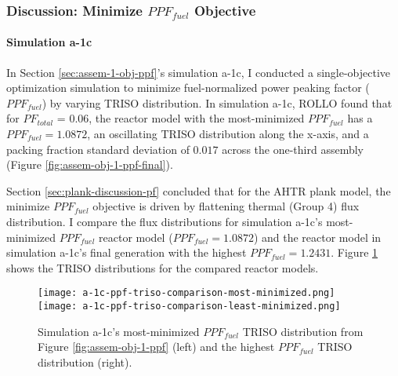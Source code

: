 \subsubsection{Discussion: Minimize $PPF_{fuel}$ Objective}
\paragraph{Simulation a-1c}
In Section \ref{sec:assem-1-obj-ppf}'s simulation a-1c, I conducted a single-objective 
optimization simulation to minimize fuel-normalized power peaking factor ($PPF_{fuel}$) 
by varying TRISO distribution. 
In simulation a-1c, \gls{ROLLO} found that for $PF_{total}$ = 0.06, the reactor model 
with the most-minimized $PPF_{fuel}$ has a $PPF_{fuel} = 1.0872$, an oscillating 
TRISO distribution along the x-axis, and a packing fraction standard deviation of 
$0.017$ across the one-third assembly (Figure \ref{fig:assem-obj-1-ppf-final}). 

Section \ref{sec:plank-discussion-pf} concluded that for the \gls{AHTR} plank 
model, the minimize $PPF_{fuel}$ objective is driven by flattening thermal 
(Group 4) flux distribution. 
I compare the flux distributions for simulation a-1c's most-minimized $PPF_{fuel}$ 
reactor model ($PPF_{fuel} = 1.0872$) and the reactor model in simulation a-1c's 
final generation with the highest $PPF_{fuel} = 1.2431$. 
Figure \ref{fig:a-1c-ppf-triso-comparison} shows the TRISO distributions for the 
compared reactor models. 
\begin{figure}[htbp!]
    \centering
    \texttt{[image: a-1c-ppf-triso-comparison-most-minimized.png]} 
    \texttt{[image: a-1c-ppf-triso-comparison-least-minimized.png]} 
    \caption{Simulation a-1c's most-minimized $PPF_{fuel}$ TRISO distribution 
    from Figure \ref{fig:assem-obj-1-ppf} (left) and the highest $PPF_{fuel}$ TRISO 
    distribution (right).}
    \label{fig:a-1c-ppf-triso-comparison}
\end{figure}

